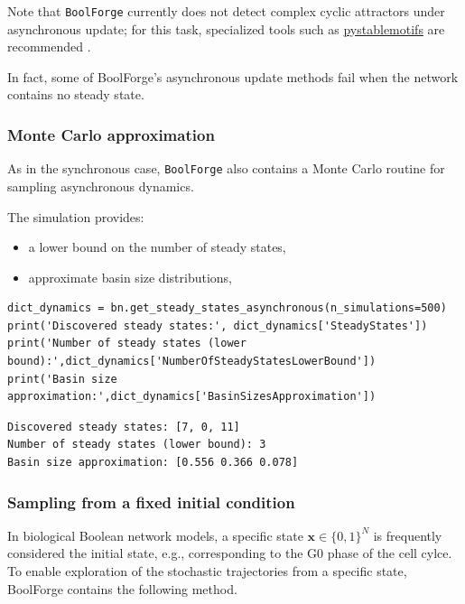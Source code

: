 \documentclass[
]{article}
\providecommand{\tightlist}{%
  \setlength{\itemsep}{0pt}\setlength{\parskip}{0pt}}
\begin{document}
Note that \texttt{BoolForge} currently does not detect complex cyclic
attractors under asynchronous update; for this task, specialized tools
such as \href{https://github.com/jcrozum/pystablemotifs}{pystablemotifs}
are recommended \citep{rozum2022pystablemotifs}.

In fact, some of BoolForge's asynchronous update methods fail when the
network contains no steady state.

\subsubsection{Monte Carlo
approximation}\label{monte-carlo-approximation}

As in the synchronous case, \texttt{BoolForge} also contains a Monte
Carlo routine for sampling asynchronous dynamics.

The simulation provides:

\begin{itemize}
\tightlist
\item
  a lower bound on the number of steady states,
\item
  approximate basin size distributions,
\end{itemize}

\begin{lstlisting}
dict_dynamics = bn.get_steady_states_asynchronous(n_simulations=500)
print('Discovered steady states:', dict_dynamics['SteadyStates'])
print('Number of steady states (lower bound):',dict_dynamics['NumberOfSteadyStatesLowerBound'])
print('Basin size approximation:',dict_dynamics['BasinSizesApproximation'])
\end{lstlisting}

\begin{lstlisting}
Discovered steady states: [7, 0, 11]
Number of steady states (lower bound): 3
Basin size approximation: [0.556 0.366 0.078]
\end{lstlisting}

\subsubsection{Sampling from a fixed initial
condition}\label{sampling-from-a-fixed-initial-condition}

In biological Boolean network models, a specific state
\(\mathbf x \in \{0,1\}^N\) is frequently considered the initial state,
e.g., corresponding to the G0 phase of the cell cylce. To enable
exploration of the stochastic trajectories from a specific state,
BoolForge contains the following method.
\end{document}
